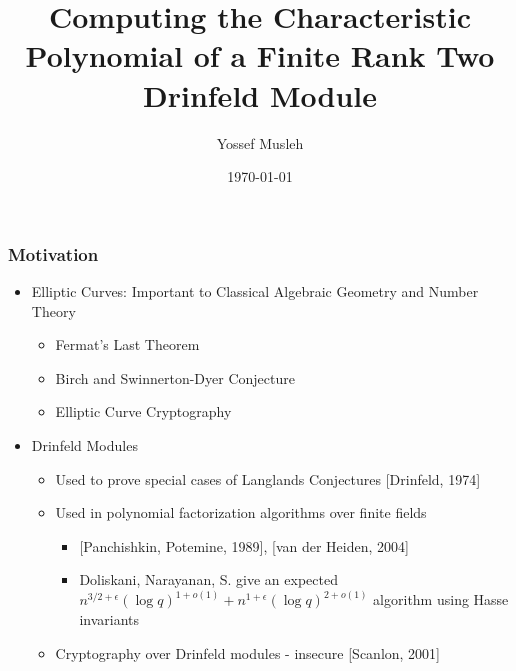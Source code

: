 \documentclass{beamer}
\title[master talk]{Computing the Characteristic Polynomial of a Finite Rank Two Drinfeld Module} %
\author{Yossef Musleh} %
\institute[UW] %
{
University of Waterloo \\ %
\medskip
\textit{ymusleh@uwaterloo.ca} %
}
\date{\today} %
\begin{document}
\begin{frame}
\titlepage %
\end{frame}



\begin{frame}
\frametitle{Motivation}

\begin{itemize}

\item  Elliptic Curves: Important to Classical Algebraic Geometry and Number Theory

\begin{itemize}
    \item Fermat's Last Theorem
    \item Birch and Swinnerton-Dyer Conjecture
    \item Elliptic Curve Cryptography
    
\end{itemize}

\item Drinfeld Modules
\begin{itemize}
    \item Used to prove special cases of Langlands Conjectures [Drinfeld, 1974]
    \item Used in polynomial factorization algorithms over finite fields
    \begin{itemize}
        \item $[$Panchishkin, Potemine, 1989], [van der Heiden, 2004]
        \item Doliskani, Narayanan, S. give an expected $n^{3/2 + \epsilon} (\log q)^{1+o(1)} + n^{1 + \epsilon} (\log q)^{2 + o(1)}$ algorithm using Hasse invariants
    \end{itemize}
    \item Cryptography over Drinfeld modules - insecure [Scanlon, 2001]
\end{itemize}
  
  
  
  
\end{itemize}

\end{frame}
\end{document}

